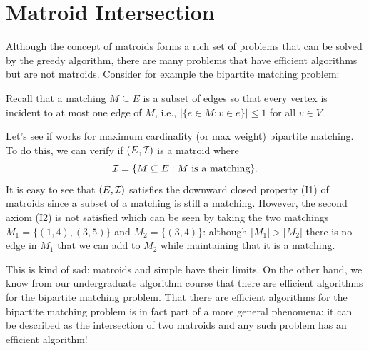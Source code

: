 % 
\section{Matroid Intersection}

Although the concept of matroids forms a rich set of problems that can be solved by the greedy
algorithm, there are many problems that have efficient algorithms but are not matroids. Consider
for example the bipartite matching problem:


Recall that a matching $M\subseteq E$ is a subset of edges so that every vertex is incident to at
most one edge of $M$, i.e., $|\{e\in M: v\in e\}|\le 1$ for all $v\in V$.


Let's see if \Greedy{} works for maximum cardinality (or max weight) bipartite matching. To do
this, we can verify if $(E,\mathcal{I})$ is a matroid where
\[
  \mathcal{I}=\{M\subseteq E: M \text{ is a matching}\}.
\]
It is easy to see that $(E,\mathcal{I})$ satisfies the downward closed property (I1) of matroids since a
subset of a matching is still a matching. However, the second axiom (I2) is not satisfied which
can be seen by taking the two matchings $M_1=\{(1,4),(3,5)\}$ and $M_2=\{(3,4)\}$: although
$|M_1|>|M_2|$ there is no edge in $M_1$ that we can add to $M_2$ while maintaining that it is a
matching.

This is kind of sad: matroids and simple \Greedy{} have their limits. On the other hand, we know
from our undergraduate algorithm course that there are efficient algorithms for the bipartite
matching problem. That there are efficient algorithms for the bipartite matching problem is in
fact part of a more general phenomena: it can be described as the intersection of two matroids
and any such problem has an efficient algorithm!

